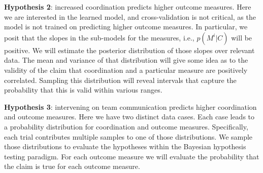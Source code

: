 \textbf{Hypothesis 2}: increased coordination predicts higher outcome measures.
Here we are interested in the learned model, and cross-validation is not
critical, as the model is not trained on predicting higher outcome measures.  In
particular, we posit that the slopes in the sub-models for the measures, i.e.,
$p(M^i|C)$ will be positive. We will estimate the posterior distribution of
those slopes over relevant data. The mean and variance of that distribution will
give some idea as to the validity of the claim that coordination and a
particular measure are positively correlated.  Sampling this distribution will
reveal intervals that capture the probability that this is valid within various
ranges. 

\textbf{Hypothesis 3}: intervening on team communication predicts higher
coordination and outcome measures. Here we have two distinct data cases. Each
case leads to a probability distribution for coordination and outcome measures.
Specifically, each trial contributes multiple samples to one of those
distributions. We sample those distributions to evaluate the hypotheses within
the Bayesian hypothesis testing paradigm.  For each outcome measure we will
evaluate the probability that the claim is true for each outcome measure.




